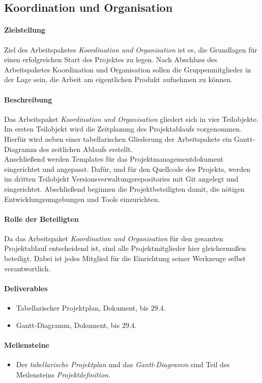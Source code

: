 \subsection{Koordination und Organisation}
\label{ap1}

\paragraph{Zielstellung}\noindent
Ziel des Arbeitspaketes \textit{Koordination und Organisation} ist es, die Grundlagen für einen erfolgreichen Start des Projektes zu legen. Nach Abschluss des Arbeitspaketes Koordination und Organisation sollen die Gruppenmitglieder in der Lage sein, die Arbeit am eigentlichen Produkt aufnehmen zu können.

\paragraph{Beschreibung}\noindent
Das Arbeitspaket \textit{Koordination und Organisation} gliedert sich in vier Teilobjekte. Im ersten Teilobjekt wird die Zeitplanung des Projektablaufs vorgenommen. Hierfür wird neben einer tabellarischen Gliederung der Arbeitspakete ein Gantt-Diagramm des zeitlichen Ablaufs erstellt.\\
Anschließend werden Templates für das Projektmanagementdokument eingerichtet und angepasst. Dafür, und für den Quellcode des Projekts, werden im dritten Teilobjekt Versionsverwaltungsrepositories mit Git angelegt und eingerichtet. Abschließend beginnen die Projektbeteiligten damit, die nötigen Entwicklungsumgebungen und Tools einzurichten.

\paragraph{Rolle der Beteiligten}\noindent
Da das Arbeitspaket \textit{Koordination und Organisation} für den gesamten Projektablauf entscheidend ist, sind alle Projektmitglieder hier gleichermaßen beteiligt. Dabei ist jedes Mitglied für die Einrichtung seiner Werkzeuge selbst verantwortlich.

\paragraph{Deliverables}\noindent
\begin{itemize}
\item Tabellarischer Projektplan, Dokument, bis 29.4.
\item Gantt-Diagramm, Dokument, bis 29.4.
\end{itemize}

\paragraph{Meilensteine}\noindent
\begin{itemize}
\item Der \textit{tabellarische Projektplan} und das \textit{Gantt-Diagramm} sind Teil des Meilensteins \textit{Projektdefinition}.
\end{itemize}
